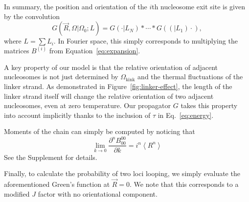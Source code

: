 \documentclass[%
 reprint,
superscriptaddress,
showpacs,preprintnumbers,
 amsmath,amssymb,
 aps,
 prl,
]{revtex4-1}
\newcommand{\greens}[2][\Omega_0; L]{G(#2|#1)}
\begin{document}
In summary, the position and orientation of the $i$th nucleosome exit site
    is given by the convolution
\begin{equation}\label{eq:conv}
    \greens{\vec{R}, \Omega} = \greens[L_N]{\cdot} * \cdots{} *
    \greens[L_1](\cdot),
\end{equation}
where $L = \sum L_i$.
In Fourier space, this simply corresponds to multiplying the matrices $B^{(i)}$
    from Equation~\ref{eq:expansion}.

A key property of our model is that the relative orientation of adjacent
    nucleosomes is not just determined by $\Omega_\text{kink}$ and the thermal
    fluctuations of the linker strand.
As demonstrated in Figure~\ref{fig:linker-effect}, the length of the linker strand
    itself will change the relative orientation of two adjacent nucleosomes,
    even at zero temperature.
Our propagator $G$ takes this property into account implicitly thanks to the
    inclusion of $\tau$ in Eq.~\ref{eq:energy}.

Moments of the chain can simply be computed by noticing that
\begin{equation}\label{eq:moments}
    \lim_{k\to0} \frac{\partial^n B_{00}^{00}}{\partial k} = i^n \left\langle
    R^n\right\rangle
\end{equation}
See the Supplement for details.

Finally, to calculate the probability of two loci looping, we simply evaluate
    the aforementioned Green's function at $\vec{R} = 0$.
We note that this corresponds to a modified $J$ factor with no orientational
    component.

\begin{figure*}[th]
    \begin{centering}
    \end{centering}
    \caption{\protect{} Zero-temperature structure vs. Monte Carlo simulation
    snapshot of nucleosome chain with \SI{38}{\basepair} linkers.
    \protect{} The Kuhn lengths of homogenous chains are
    \SI{10.5}{\basepair} periodic in linker length, with each linker length
    representing a distinct, discretized helical WLC\@. In the limit of long
    linkers, the kuhn length eventually approaches that of bare DNA,
    \SI{100}{\nano\metre}. \protect{} Compact, superhelical
    structures afford more flexibility than non-compact fibres, which have
    higher Kuhn lengths. Thus, the overall structure of chromatin is extremely
    sensitive to changes in the nucleosome repeat length.}\label{fig:homo-kuhn}
\end{figure*}
\end{document}
